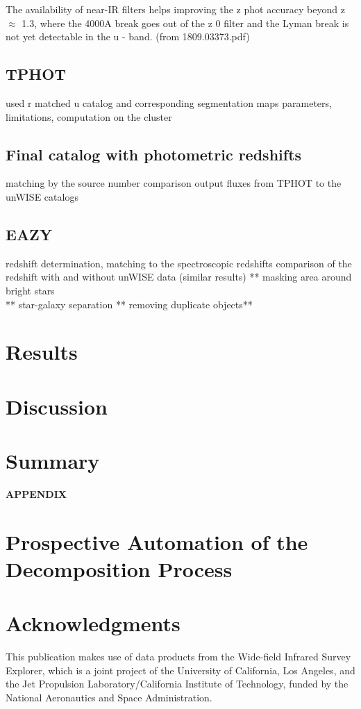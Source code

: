 \documentclass[numberedappendix,apj,twocolumn]{emulateapj}
\begin{document}
The availability of near-IR filters helps improving the
z phot accuracy beyond z $\approx$ 1.3, where the 4000A break goes out
of the z 0 filter and the Lyman break is not yet detectable in the
u - band. (from 1809.03373.pdf)

\subsection{TPHOT} 
	used r matched u catalog and corresponding segmentation maps
	parameters, limitations, computation on the cluster 

\subsection{Final catalog with photometric redshifts} 
	matching by the source number
	comparison output fluxes from TPHOT to the unWISE catalogs

\subsection{EAZY} 
	redshift determination, matching to the spectroscopic redshifts
	comparison of the redshift with and without unWISE data (similar results)
** masking area around bright stars\\
** star-galaxy separation
** removing duplicate objects**

	
\section{Results}

\section{Discussion}


\section{Summary}


\acknowledgements



%


%

\newpage
\centerline{ {\bf APPENDIX}}
\appendix
\section{Prospective Automation of the Decomposition Process}

\section{Acknowledgments}
This publication makes use of data products from the Wide-field Infrared Survey Explorer, which is a joint project of the University of California, Los Angeles, and the Jet Propulsion Laboratory/California Institute of Technology, funded by the National Aeronautics and Space Administration.
\end{document}

